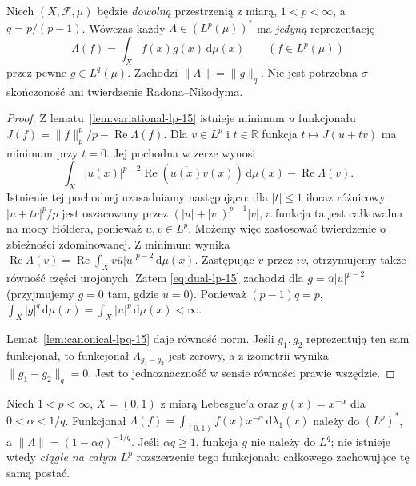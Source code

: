\begin{twierdzenie}
\label{thm:dual-lp-15}
Niech $(X,\mathcal F,\mu)$ będzie \emph{dowolną} przestrzenią
z miarą, $1<p<\infty$, a $q=p/(p-1)$.
Wówczas każdy $\Lambda\in (L^p(\mu))^*$ ma \emph{jedyną}
reprezentację
\begin{equation}\label{eq:dual-lp-15}
\Lambda(f)=\int_X f(x)g(x)\,\mathrm d\mu(x)
\qquad(f\in L^p(\mu))
\end{equation}
przez pewne $g\in L^q(\mu)$. Zachodzi
$\|\Lambda\|=\|g\|_q$. Nie jest potrzebna
$\sigma$-skończoność ani twierdzenie Radona--Nikodyma.
\end{twierdzenie}
\begin{proof}
Z lematu~\ref{lem:variational-lp-15} istnieje minimum $u$
funkcjonału $J(f)=\|f\|_p^p/p-\operatorname{Re}\Lambda(f)$.
Dla $v\in L^p$ i $t\in\mathbb R$ funkcja $t\mapsto J(u+tv)$
ma minimum przy $t=0$. Jej pochodna w zerze wynosi
\[
\int_X |u(x)|^{p-2}\operatorname{Re}(\overline{u(x)}v(x))
\,\mathrm d\mu(x)-\operatorname{Re}\Lambda(v).
\]
Istnienie tej pochodnej uzasadniamy następująco:
dla $|t|\le1$ iloraz różnicowy $|u+tv|^p/p$ jest
oszacowany przez $(|u|+|v|)^{p-1}|v|$,
a funkcja ta jest całkowalna na mocy Höldera,
ponieważ $u,v\in L^p$. Możemy więc zastosować
twierdzenie o zbieżności zdominowanej. Z minimum
wynika $\operatorname{Re}\Lambda(v)=
\operatorname{Re}\int_Xv\overline u|u|^{p-2}\,\mathrm d\mu(x)$.
Zastępując $v$ przez $iv$, otrzymujemy także
równość części urojonych. Zatem \eqref{eq:dual-lp-15}
zachodzi dla $g=\overline u|u|^{p-2}$ (przyjmujemy $g=0$
tam, gdzie $u=0$). Ponieważ $(p-1)q=p$,
$\int_X|g|^q\,\mathrm d\mu(x)=\int_X|u|^p\,\mathrm d\mu(x)<\infty$.

Lemat~\ref{lem:canonical-lpq-15} daje równość norm.
Jeśli $g_1,g_2$ reprezentują ten sam funkcjonał,
to funkcjonał $\Lambda_{g_1-g_2}$ jest zerowy,
a z izometrii wynika $\|g_1-g_2\|_q=0$.
Jest to jednoznaczność w sensie równości prawie wszędzie.
\end{proof}

\begin{przyklad}
Niech $1<p<\infty$, $X=(0,1)$ z miarą Lebesgue'a
oraz $g(x)=x^{-\alpha}$ dla $0<\alpha<1/q$.
Funkcjonał $\Lambda(f)=\int_{(0,1)}f(x)x^{-\alpha}
\,\mathrm d\lambda_1(x)$ należy do $(L^p)^*$, a
$\|\Lambda\|=(1-\alpha q)^{-1/q}$.
Jeśli $\alpha q\ge1$, funkcja $g$ nie należy do $L^q$;
nie istnieje wtedy \emph{ciągłe na całym $L^p$} rozszerzenie
tego funkcjonału całkowego zachowujące tę samą postać.
\end{przyklad}


